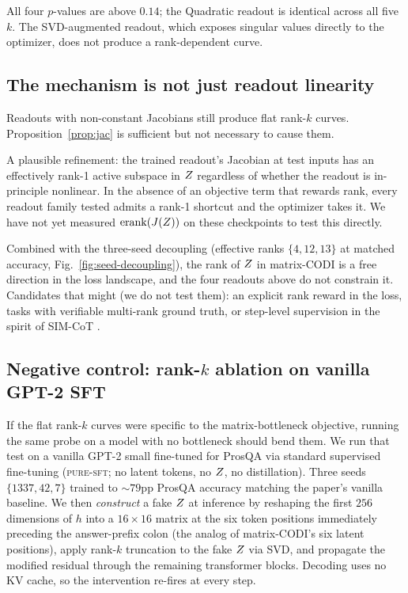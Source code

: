 All four $p$-values are above $0.14$; the Quadratic readout is
identical across all five $k$. The SVD-augmented readout, which
exposes singular values directly to the optimizer, does not produce
a rank-dependent curve.

\subsection{The mechanism is not just readout linearity}

Readouts with non-constant Jacobians still produce flat rank-$k$
curves. Proposition~\ref{prop:jac} is sufficient but not necessary
to cause them.

A plausible refinement: the trained readout's Jacobian at test
inputs has an effectively rank-1 active subspace in $Z$ regardless
of whether the readout is in-principle nonlinear. In the absence of
an objective term that rewards rank, every readout family tested
admits a rank-1 shortcut and the optimizer takes it. We have not
yet measured $\mathrm{erank}(J(Z))$ on these checkpoints to test
this directly.

Combined with the three-seed decoupling (effective ranks
$\{4,12,13\}$ at matched accuracy, Fig.~\ref{fig:seed-decoupling}),
the rank of $Z$ in matrix-CODI is a free direction in the loss
landscape, and the four readouts above do not constrain it.
Candidates that might (we do not test them): an explicit rank reward
in the loss, tasks with verifiable multi-rank ground truth, or
step-level supervision in the spirit of SIM-CoT
\citep{shen2025simcot}.

\subsection{Negative control: rank-$k$ ablation on vanilla GPT-2 SFT}
\label{sec:pc-negctrl}

If the flat rank-$k$ curves were specific to the matrix-bottleneck
objective, running the same probe on a model with no bottleneck
should bend them. We run that test on a vanilla GPT-2 small
fine-tuned for ProsQA via standard supervised fine-tuning
(\textsc{pure-sft}; no latent tokens, no $Z$, no distillation).
Three seeds $\{1337, 42, 7\}$ trained to $\sim\!79$pp ProsQA accuracy
matching the paper's vanilla baseline. We then \emph{construct} a
fake $Z$ at inference by reshaping the first $256$ dimensions of
$h$ into a $16\!\times\!16$ matrix at the six token positions
immediately preceding the answer-prefix colon (the analog of
matrix-CODI's six latent positions), apply rank-$k$ truncation to
the fake $Z$ via SVD, and propagate the modified residual through
the remaining transformer blocks. Decoding uses no KV cache, so the
intervention re-fires at every step.

